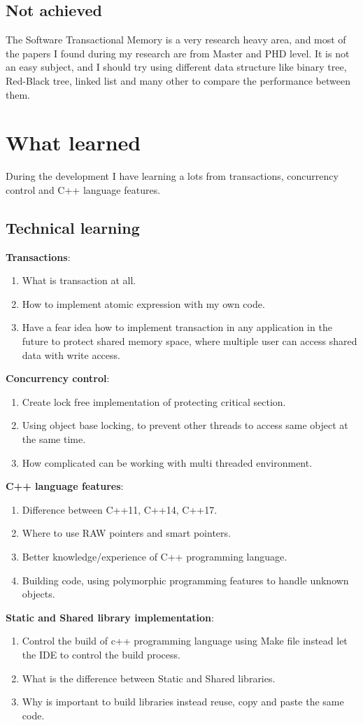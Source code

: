 \documentclass[12pt]{article}
\begin{document}
\subsection{Not achieved}
The Software Transactional Memory is a very research heavy area, and most of the papers I found during my research are from Master and PHD level. It is not an easy subject, and I should try using different data structure like binary tree, Red-Black tree, linked list and many other to compare the performance between them.\\


\newpage
\section{What learned}
During the development I have learning a lots from transactions, concurrency control and C++ language features.
\subsection{Technical learning}
\textbf{Transactions}:
\begin{enumerate}
\item What is transaction at all. 
\item How to implement atomic expression with my own code.
\item Have a fear idea how to implement transaction in any application in the future to protect shared memory space, where multiple user can access shared data with write access.
\end{enumerate}
\textbf{Concurrency control}:
\begin{enumerate}
\item Create lock free implementation of protecting critical section. 
\item Using object base locking, to prevent other threads to access same object at the same time.
\item How complicated can be working with multi threaded environment.
\end{enumerate}
\textbf{C++ language features}:
\begin{enumerate}
\item Difference between C++11, C++14, C++17.
\item Where to use RAW pointers and smart pointers.
\item Better knowledge/experience of C++ programming language.
\item Building code, using polymorphic programming features to handle unknown objects.
\end{enumerate}
\textbf{Static and Shared library implementation}:
\begin{enumerate}
\item Control the build of c++ programming language using Make file instead let the IDE to control the build process.
\item What is the difference between Static and Shared libraries.
\item Why is important to build libraries instead reuse, copy and paste the same code.
\end{enumerate}
\end{document}
